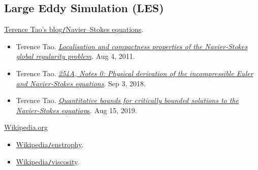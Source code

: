 \documentclass{article}
\numberwithin{equation}{section}
\begin{document}
\subsection{Large Eddy Simulation (LES)}


\begin{thebibliography}{99}
	 \href{https://terrytao.wordpress.com/tag/navier-stokes-equations/}{Terence Tao's blog\texttt{/}Navier--Stokes equations}.
	\begin{itemize}
		\item Terence Tao. \href{https://terrytao.wordpress.com/2011/08/04/localisation-and-compactness-properties-of-the-navier-stokes-global-regularity-problem}{\textit{Localisation and compactness properties of the Navier-Stokes global regularity problem}}. Aug 4, 2011.
		
		\item Terence Tao. \href{https://terrytao.wordpress.com/2018/09/03/254a-notes-0-physical-derivation-of-the-incompressible-euler-and-navier-stokes-equations}{\textit{254A, Notes 0: Physical derivation of the incompressible Euler and Navier-Stokes equations}}. Sep 3, 2018.
		
		\item Terence Tao. \href{https://terrytao.wordpress.com/2019/08/15/quantitative-bounds-for-critically-bounded-solutions-to-the-navier-stokes-equations/}{\textit{Quantitative bounds for critically bounded solutions to the Navier-Stokes equation}s}. Aug 15, 2019.
	\end{itemize}
	
	 \href{https://en.wikipedia.org}{Wikipedia.org}
	\begin{itemize}
		\item \href{https://en.wikipedia.org/wiki/Enstrophy}{Wikipedia\texttt{/}enstrophy}.
		\item \href{https://en.wikipedia.org/wiki/Viscosity}{Wikipedia\texttt{/}viscosity}.
	\end{itemize}
\end{thebibliography}

\printbibliography[heading=bibintoc]
	
\end{document}
